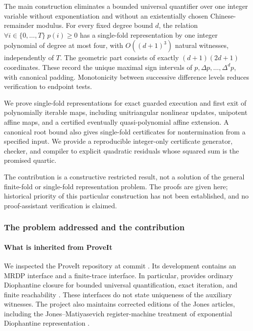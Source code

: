 \documentclass[11pt,a4paper]{article}
\theoremstyle{definition}
\theoremstyle{remark}
\newcommand{\code}[1]{\texttt{\detokenize{#1}}}
\begin{document}
The main construction eliminates a bounded universal quantifier over one
integer variable without exponentiation and without an existentially chosen
Chinese-remainder modulus. For every fixed degree bound $d$, the relation
$\forall i\in\{0,\ldots,T\}\;p(i)\geq0$ has a single-fold representation by
one integer polynomial of degree at most four, with $O((d+1)^3)$ natural
witnesses, independently of $T$. The geometric part consists of exactly
$(d+1)(2d+1)$ coordinates. These record the unique maximal sign intervals of
$p,\Delta p,\ldots,\Delta^d p$, with canonical padding. Monotonicity between
successive difference levels reduces verification to endpoint tests.

We prove single-fold representations for exact guarded execution and first
exit of polynomially iterable maps, including unitriangular nonlinear
updates, unipotent affine maps, and a certified eventually quasi-polynomial
affine extension. A canonical root bound also gives single-fold certificates
for nontermination from a specified input. We provide a reproducible
integer-only certificate generator, checker, and compiler to explicit
quadratic residuals whose squared sum is the promised quartic.

The contribution is a constructive restricted result, not a solution of the
general finite-fold or single-fold representation problem. The proofs are
given here; historical priority of this particular construction has not been
established, and no proof-assistant verification is claimed.


\subsubsection{The problem addressed and the contribution}
\label{cdc:pt:sec:intro}


\paragraph{What is inherited from ProveIt}
\label{cdc:pt:subsec:repo}
We inspected the ProveIt repository at commit . Its
 development contains an MRDP
interface and a finite-trace interface. In particular,
\code{DiophantineTrace.lean} provides ordinary Diophantine closure for
bounded universal quantification, exact iteration, and finite reachability
\cite{repo-trace}. These interfaces do not state uniqueness of the
auxiliary witnesses. The project also maintains corrected editions of the
Jones articles, including the Jones--Matiyasevich register-machine treatment
of exponential Diophantine representation \cite{repo-h10}.
\end{document}
